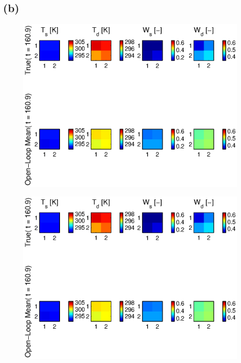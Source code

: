 \documentclass[letterpaper]{tufte-handout}
\begin{document}
\subsection{(b)}
\begin{figure}
  \includegraphics[width=\textwidth]{4b1map}
  \caption{}
\end{figure}
\begin{figure}
  \includegraphics[width=\textwidth]{4b4map}
\end{figure}
\end{document}
